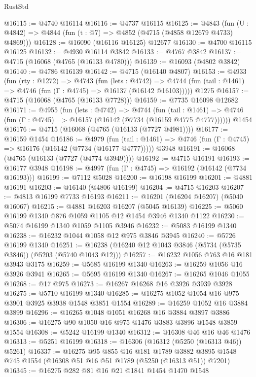 \begin{lexlean}{RustStd}
\begin{coremodule}
@16115 := @4740 @16114
@16116 := @4737 @16115
@16125 := @4843
    (fun (U : @4842) => @4844 (fun (t : @7) => @4852 (@4715 (@4858 @12679 @4733) @4869)))
@16128 := @16090 (@16116 @16125) @12677
@16130 := @4700 @16115 @16125
@16132 := @4930 @16114 @3842
@16133 := @4767 @3842
@16137 := @4715 (@16068 (@4765 (@16133 @4780)))
@16139 := @16093 (@4802 @3842)
@16140 := @4786 @16139
@16142 := @4715 (@16140 @4807)
@16153 := @4933
    (fun (rty : @1272) =>
    @4743
      (fun (lets : @4742) =>
      @4744 (fun (tail : @1461) => @4746 (fun (Γ : @4745) => @16137 (@16142 @16103)))))
    @1275
@16157 := @4715 (@16068 (@4765 (@16133 @7728)))
@16159 := @7735 @16098 @12682
@16171 := @4955
    (fun (lets : @4742) =>
    @4744
      (fun (tail : @1461) =>
      @4746 (fun (Γ : @4745) => @16157 (@16142 (@7734 (@16159 @4775 @4777))))))
    @1454
@16176 := @4715 (@16068 (@4765 (@16133 (@7727 @4981))))
@16177 := @16159 @1454
@16186 := @4979
    (fun (tail : @1461) => @4746 (fun (Γ : @4745) => @16176 (@16142 (@7734 (@16177 @4777)))))
    @3948
@16191 := @16068 (@4765 (@16133 (@7727 (@4774 @3949))))
@16192 := @4715 @16191
@16193 := @16177 @3948
@16198 := @4997 (fun (Γ : @4745) => @16192 (@16142 (@7734 @16193)))
@16199 := @7112 @5028
@16200 := @16198 @16199
@16201 := @4881 @16191
@16203 := @16140 (@4806 @16199)
@16204 := @4715 @16203
@16207 := @4813 @16199 @7733 @16193
@16211 := @16201 (@16204 @16207) (@5040 @16067)
@16215 := @4881 @16203 @16207 (@5045 @16139)
@16225 := @5060 @16199 @1340 @876 @1059 @1105 @12 @1454 @3946 @1340 @1122
@16230 := @5074 @16199 @1340 @1059 @1105 @3946
@16232 := @5083 @16199 @1340
@16238 := @16232 @1044 @1058 @12 @975 @3846 @3945
@16240 := @5726 @16199 @1340
@16251 := @16238 (@16240 @12 @1043 @3846 (@5734 (@5735 @3846)) (@5203 (@5740 @1043 @12)))
@16257 := @16232 @1056 @763 @16 @181 @3943 @3175
@16259 := @5685 @16199 @1340
@16263 := @16259 @1056 @16 @3926 @3941
@16265 := @5695 @16199 @1340
@16267 := @16265 @1046 @1055
@16268 := @17 @975
@16273 := @16267 @16268 @16 @3926 @3939 @3928
@16275 := @5710 @16199 @1340
@16285 := @16275 @1052 @1054 @16 @975 @3901 @3925 @3938 @1548 @3851 @1554
@16289 := @16259 @1052 @16 @3884 @3899
@16296 := @16265 @1048 @1051 @16268 @16 @3884 @3897 @3886
@16306 := @16275 @90 @1050 @16 @975 @1476 @3883 @3896 @1548 @3859 @1554
@16308 := @5242 @16199 @1340
@16312 := @16308 @46 @16 @46 @1476
@16313 := @5251 @16199
@16318 := @16306 (@16312 (@5250 (@16313 @46)) @5261)
@16337 := @16275
    @95
    @855
    @16
    @181
    @1789
    @3882
    @3895
    @1548
    @745
    @1554
    (@16308 @51 @16 @51 @1789 (@5250 (@16313 @51)) @7201)
@16345 := @16275 @282 @81 @16 @21 @1841 @1454 @1470 @1548

\end{coremodule}
\end{lexlean}
